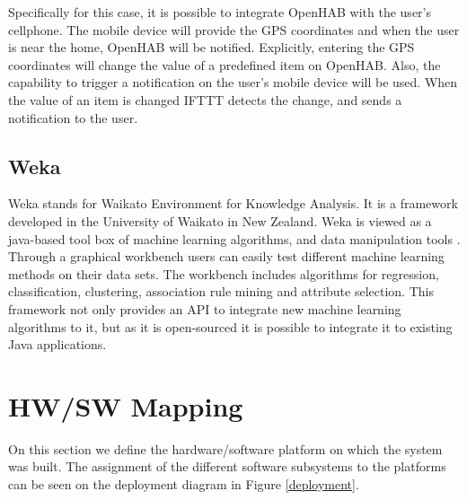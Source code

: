 Specifically for this case, it is possible to integrate OpenHAB with the user's cellphone. The mobile device will provide the GPS coordinates and when the user is near the home, OpenHAB will be notified. Explicitly, entering the GPS coordinates will change the value of a predefined item on OpenHAB. Also, the capability to trigger a notification on the user's mobile device will be used. When the value of an item is changed IFTTT detects the change, and sends a notification to the user.

\subsection{Weka}
Weka stands for  Waikato Environment for Knowledge Analysis. It is a framework developed in the University of Waikato in New Zealand. Weka is viewed as a java-based tool box of machine learning algorithms, and data manipulation tools \cite{Hall:2009:WDM:1656274.1656278}. Through
a graphical workbench users can easily test different machine learning methods on their  data sets. The workbench includes algorithms for regression, classification, clustering, association rule mining and attribute selection. This framework not only provides an API to integrate new machine learning algorithms to it, but as it is open-sourced it is possible to integrate it to existing Java applications. 


\section{HW/SW Mapping}

On this section we define the hardware/software platform on which the system was built. The assignment of the different software subsystems to the platforms can be seen on the deployment diagram in Figure \ref{deployment}.


